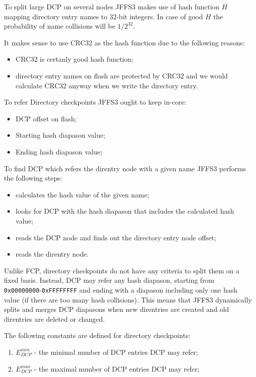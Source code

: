 \documentclass[12pt,a4paper,oneside,titlepage]{article}
\begin{document}
To split large DCP on several nodes JFFS3 makes use of hash function
$H$ mapping directory entry names to 32-bit integers. In case of good
$H$ the probability of name collisions will be $1/2^{32}$.

It makes sense to use CRC32 as the hash function due to the following
reasons:
\begin{itemize}
\item CRC32 is certanly good hash function;
\item directory entry names on flash are protected by CRC32 and we
would calculate CRC32 anyway when we write the directory entry.
\end{itemize}

To refer Directory checkpoints JFFS3 ought to keep in-core:
\begin{itemize}
\item DCP offset on flash;
\item Starting hash diapason value;
\item Ending hash diapason value;
\end{itemize}

To find DCP which refers the direntry node with a given name JFFS3
performs the following steps:
\begin{itemize}
\item calculates the hash value of the given name;
\item looks for DCP with the hash diapason that includes the calculated
hash value;
\item reads the DCP node and finds out the directory entry node offset;
\item reads the direntry node.
\end{itemize}

Unlike FCP, directory checkpoints do not have any criteria to split them
on a fixed basis. Instead, DCP may refer any hash diapason, starting
from \mbox{\texttt{0x00000000}-\texttt{0xFFFFFFFF}} and ending with a
diapason including only one hash value (if there are too many
hash collisions). This means that JFFS3 dynamically splits and merges
DCP diapasons when new direntries are created and old direntries are
deleted or changed.

The following constants are defined for directory checkpoints:
\begin{enumerate}
\item $E_{DCP}^{min}$ - the minimal number of DCP entries DCP may
refer;
\item $E_{DCP}^{max}$ - the maximal number of DCP entries DCP may refer;
\end{enumerate}
\end{document}
